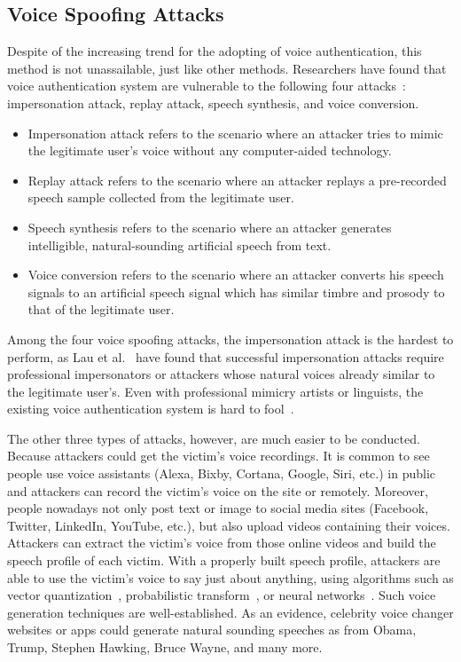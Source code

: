  

\subsection{Voice Spoofing Attacks}\label{sec:spoof}
Despite of the increasing trend for the adopting of voice authentication, this method is not unassailable, just like other methods. Researchers have found that voice authentication system are vulnerable to the following four attacks~\cite{wu2015spoofing}: impersonation attack, replay attack, speech synthesis, and voice conversion.
\begin{itemize}
	\item  Impersonation attack refers to the scenario where an attacker tries to mimic the legitimate user’s voice without any computer-aided technology.
	\item Replay attack refers to the scenario where an attacker replays a pre-recorded speech sample collected from the legitimate user. 
	\item Speech synthesis refers to the scenario where an attacker generates intelligible, natural-sounding artificial speech from text.
	\item Voice conversion refers to the scenario where an attacker converts his speech signals to an artificial speech signal which has similar timbre and prosody to that of the legitimate user.
\end{itemize}


Among the four voice spoofing attacks, the impersonation attack is the hardest to perform, as Lau et al.~\cite{lau2005testing} have found that successful impersonation attacks require professional impersonators or attackers whose natural voices already similar to the legitimate user's. Even with professional mimicry artists or linguists, the existing voice authentication system is hard to fool~\cite{mariethoz2005can}.


The other three types of attacks, however, are much easier to be conducted. Because attackers could get the victim's voice recordings. It is common to see people use voice assistants (Alexa, Bixby, Cortana, Google, Siri, etc.) in public and attackers can record the victim's voice on the site or remotely. Moreover, people nowadays not only post text or image to social media sites (Facebook, Twitter, LinkedIn, YouTube, etc.), but also upload videos containing their voices. Attackers can extract the victim's voice from those online videos and build the speech profile of each victim. With a properly built speech profile, attackers are able to use the victim's voice to say just about anything, using algorithms such as vector quantization~\cite{abe1990voice}, probabilistic transform~\cite{stylianou1998continuous}, or neural networks~\cite{desai2009voice}. Such voice generation techniques are well-established. As an evidence, celebrity voice changer websites or apps could generate natural sounding speeches as from Obama, Trump, Stephen Hawking, Bruce Wayne, and many more.




